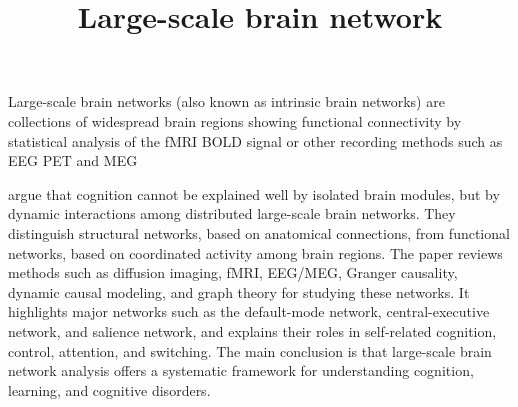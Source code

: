 \documentclass[a4paper]{article}
\title{Large-scale brain network}
\date{}
\begin{document}
    \maketitle
    Large-scale brain networks (also known as intrinsic brain networks) are collections of widespread brain regions showing functional connectivity by statistical analysis of the fMRI BOLD signal or other recording methods such as EEG PET and MEG 
    
    \cite{bressler-2010-large-scale-brain-networks-in-cognition-emerging-methods-and-principles} argue that cognition cannot be explained well by isolated brain modules, but by dynamic interactions among distributed large-scale brain networks. They distinguish structural networks, based on anatomical connections, from functional networks, based on coordinated activity among brain regions. The paper reviews methods such as diffusion imaging, fMRI, EEG/MEG, Granger causality, dynamic causal modeling, and graph theory for studying these networks. It highlights major networks such as the default-mode network, central-executive network, and salience network, and explains their roles in self-related cognition, control, attention, and switching. The main conclusion is that large-scale brain network analysis offers a systematic framework for understanding cognition, learning, and cognitive disorders.
    
    
    
\end{document}
